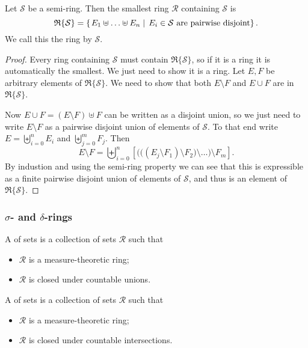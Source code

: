 \begin{lemma}
Let $\mathcal{S}$ be a semi-ring. Then the smallest ring $\mathcal{R}$ containing $\mathcal{S}$ is
\[ \mathfrak{R}\{\mathcal{S}\} = \left\{\left. E_1\uplus\ldots\uplus E_n \;\right|\; \text{$E_i\in \mathcal{S}$ are pairwise disjoint} \right\}. \]
We call this the ring  by $\mathcal{S}$.
\end{lemma}
\begin{proof}
Every ring containing $\mathcal{S}$ must contain $\mathfrak{R}\{\mathcal{S}\}$, so if it is a ring it is automatically the smallest. We just need to show it is a ring. Let $E,F$ be arbitrary elements of $\mathfrak{R}\{\mathcal{S}\}$. We need to show that both $E\setminus F$ and $E\cup F$ are in $\mathfrak{R}\{\mathcal{S}\}$.

Now $E\cup F = (E\setminus F) \uplus F$ can be written as a disjoint union, so we just need to write $E\setminus F$ as a pairwise disjoint union of elements of $\mathcal{S}$. To that end write $E = \biguplus_{i=0}^nE_i$ and $\biguplus_{j= 0}^mF_j$. Then
\[ E\setminus F = \biguplus_{i=0}^n \left[ \Big(\big((E_j\setminus F_1)\setminus F_2\big)\setminus \ldots\Big)\setminus F_m \right]. \]
By industion and using the semi-ring property we can see that this is expressible as a finite pairwise disjoint union of elements of $\mathcal{S}$, and thus is an element of $\mathfrak{R}\{\mathcal{S}\}$.
\end{proof}

\subsubsection{$\sigma$- and $\delta$-rings}
\begin{definition}
A  of sets is a collection of sets $\mathcal{R}$ such that
\begin{itemize}
\item $\mathcal{R}$ is a measure-theoretic ring;
\item $\mathcal{R}$ is closed under countable unions.
\end{itemize}
A  of sets is a collection of sets $\mathcal{R}$ such that
\begin{itemize}
\item $\mathcal{R}$ is a measure-theoretic ring;
\item $\mathcal{R}$ is closed under countable intersections.
\end{itemize}
\end{definition}

